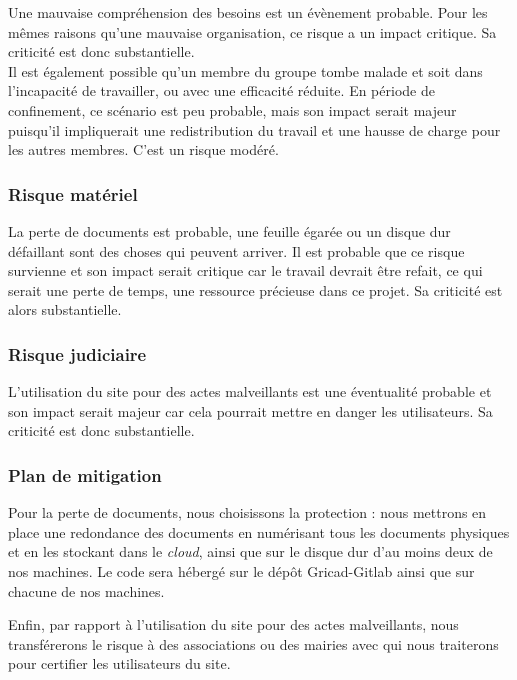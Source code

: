 \documentclass[a4paper,11pt]{article}
\begin{document}
Une mauvaise compréhension des besoins est un évènement probable. Pour les mêmes raisons
qu'une mauvaise organisation, ce risque a un impact critique. Sa criticité est donc substantielle.\\

Il est également possible qu'un membre du groupe tombe malade et soit dans l'incapacité de travailler, ou avec une efficacité réduite. En période de confinement, ce scénario est peu probable, mais son impact
serait majeur puisqu'il impliquerait une redistribution du travail et une hausse de charge pour les autres membres. C'est un risque modéré.\\

\subsubsection{Risque matériel}

La perte de documents est probable, une feuille égarée ou un disque dur défaillant sont des choses
qui peuvent arriver. Il est probable que ce risque survienne et son impact serait critique car le travail
devrait être refait, ce qui serait une perte de temps, une ressource précieuse dans
ce projet. Sa criticité est alors substantielle.\\

\subsubsection{Risque judiciaire}

L’utilisation du site pour des actes malveillants est une éventualité probable et son impact serait
majeur car cela pourrait mettre en danger les utilisateurs. Sa criticité est donc substantielle.\\

\subsubsection{Plan de mitigation}

Pour la perte de documents, nous choisissons la protection : nous mettrons en place une redondance
des documents en numérisant tous les documents physiques et en les stockant dans le \textit{cloud}, ainsi
que sur le disque dur d’au moins deux de nos machines. Le code sera hébergé sur le dépôt Gricad-Gitlab ainsi que sur chacune de nos machines.

Enfin, par rapport à l’utilisation du site pour des actes malveillants, nous transférerons le risque à des
associations ou des mairies avec qui nous traiterons pour certifier les utilisateurs du site.
\end{document}
